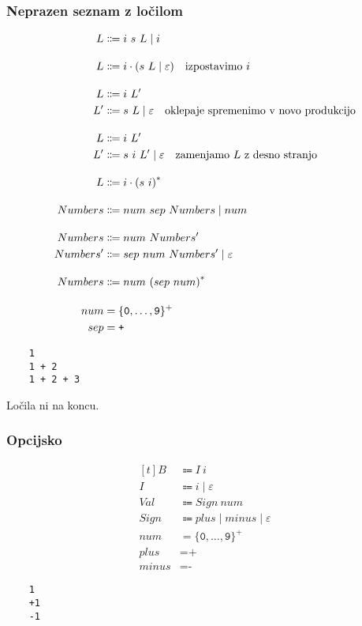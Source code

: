 \documentclass{report}
\newcommand{\Null}{\varepsilon}
\newcommand{\Char}[1]{\texttt{#1}}
\newcommand{\Seq}{\cdot}
\newcommand{\Spc}{\ }
\newcommand{\Union}{\mathrel{|}}
\newcommand{\Kleene}[1]{{#1}^\ast}
\newcommand{\KleenePlus}[1]{#1^+}
\newcommand{\Arrow}{\Coloneq}
\newcommand{\NT}[1]{{#1}}
\newcommand{\T}[1]{{#1}}
\begin{document}
    \subsubsection{Neprazen seznam z ločilom}
    \begin{equation*}
      \begin{aligned}[t]
        \NT{L} &\Arrow \T{i} \Spc \T{s} \Spc \NT{L} \Union \T{i}\\[1em]
        \NT{L} &\Arrow \T{i} \Seq (\T{s} \Spc \NT{L} \Union \Null)\text{\quad izpostavimo $\T{i}$}\\[1em]
        \NT{L} &\Arrow \T{i} \Spc \NT{L'}\\
        \NT{L'} &\Arrow \T{s} \Spc \NT{L} \Union \Null \text{\quad oklepaje spremenimo v novo produkcijo}\\[1em]
        \NT{L} &\Arrow \T{i} \Spc \NT{L'}\\
        \NT{L'} &\Arrow \T{s} \Spc \T{i} \Spc \NT{L'} \Union \Null \text{\quad zamenjamo $\NT{L}$ z desno stranjo}\\[1em]
        \NT{L} &\Arrow \T{i} \Seq \Kleene{(\T{s} \Spc \T{i})}\\[1em]
        \NT{Numbers} &\Arrow \T{num} \Spc \T{sep} \Spc \NT{Numbers} \Union \T{num}\\[1em]
        \NT{Numbers} &\Arrow \T{num} \Spc \NT{Numbers'}\\
        \NT{Numbers'} &\Arrow \T{sep} \Spc \T{num} \Spc \NT{Numbers'} \Union \Null\\[1em]
        \NT{Numbers} &\Arrow \T{num} \Spc \Kleene{(\T{sep} \Spc \T{num})}\\[1em]
        \T{num} &= \KleenePlus{\{\Char{0}, \dots, \Char{9}\}}\\
        \T{sep} &= \Char{+}
      \end{aligned}
    \end{equation*}
    \begin{lstlisting}
    1
    1 + 2
    1 + 2 + 3
    \end{lstlisting}
    Ločila ni na koncu.

    \subsubsection{Opcijsko}
    \begin{equation*}
      \begin{aligned}[t]
        \NT{B} &\Arrow \NT{I} \Spc \T{i}\\
        \NT{I} &\Arrow \T{i} \Union \Null \\[1em]
        \NT{Val} &\Arrow \NT{Sign} \Spc \T{num}\\
        \NT{Sign} &\Arrow \T{plus} \Union \T{minus} \Union \Null\\[1em]
        \T{num} &= \KleenePlus{\{\Char{0}, \dots, \Char{9}\}}\\
        \T{plus} &= \Char{+}\\
        \T{minus} &= \Char{-}
      \end{aligned}
    \end{equation*}
    \begin{lstlisting}
    1
    +1
    -1
    \end{lstlisting}
\end{document}
